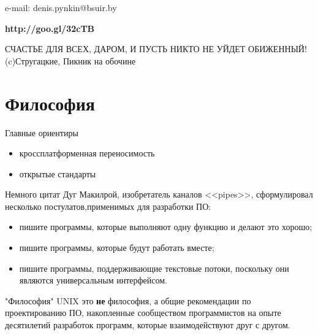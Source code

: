 

\subtitle{Программы, протоколы, форматы данных и не только...}

%
%

\begin{frame}
\titlepage
\begin{center}
e-mail: denis.pynkin@bsuir.by\\
\end{center}
\begin{center}
{\bfseries http://goo.gl/32cTB}

{\tiny СЧАСТЬЕ ДЛЯ ВСЕХ, ДАРОМ, И ПУСТЬ НИКТО НЕ УЙДЕТ ОБИЖЕННЫЙ!\\
(c)Стругацкие, Пикник на обочине}
\end{center}
\end{frame}

\section{Философия}

\begin{frame}{Главные ориентиры}
	\begin{itemize}
		\item кроссплатформенная переносимость
			\pause
		\item открытые стандарты
	\end{itemize}
\end{frame}

\begin{frame}{Немного цитат}
Дуг Макилрой, изобретатель каналов <<pipes>>, сформулировал несколько постулатов,применимых для разработки ПО:
\pause
	\begin{itemize}
		\item пишите программы,  которые выполняют одну функцию и делают это хорошо;
			\pause
		\item пишите программы,  которые будут работать вместе;
			\pause
		\item пишите программы,  поддерживающие текстовые потоки,  поскольку они являются универсальным интерфейсом.
	\end{itemize}

\end{frame}


\begin{frame}{"Философия" UNIX}
	это {\bfseries не} философия,  а общие рекомендации по проектированию ПО,  накопленные сообществом программистов на опыте десятилетий разработок программ,  которые взаимодействуют друг с другом.
\end{frame}

